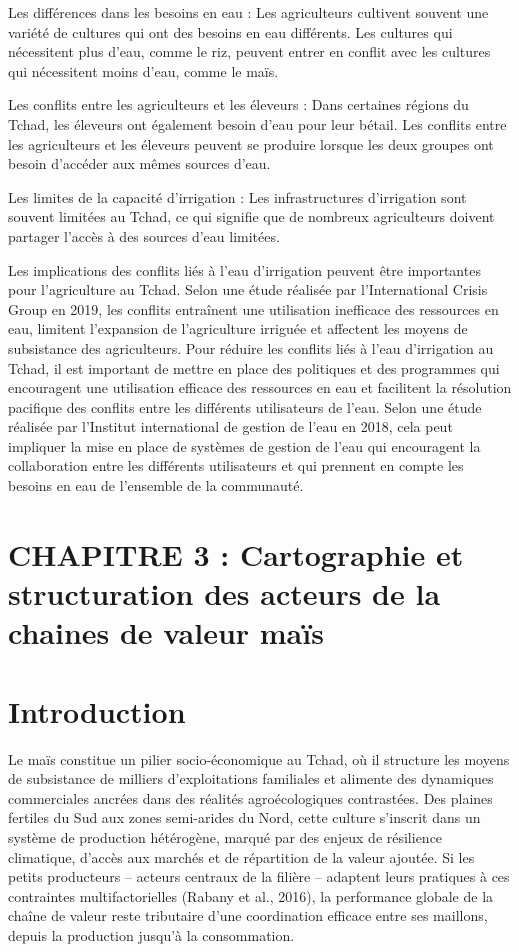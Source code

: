 \documentclass[12pt,oneside]{report}
\begin{document}
Les différences dans les besoins en eau : Les agriculteurs cultivent souvent une variété de cultures qui ont des besoins en eau différents. Les cultures qui nécessitent plus d'eau, comme le riz, peuvent entrer en conflit avec les cultures qui nécessitent moins d'eau, comme le maïs.

Les conflits entre les agriculteurs et les éleveurs : Dans certaines régions du Tchad, les éleveurs ont également besoin d'eau pour leur bétail. Les conflits entre les agriculteurs et les éleveurs peuvent se produire lorsque les deux groupes ont besoin d'accéder aux mêmes sources d'eau.

Les limites de la capacité d'irrigation : Les infrastructures d'irrigation sont souvent limitées au Tchad, ce qui signifie que de nombreux agriculteurs doivent partager l'accès à des sources d'eau limitées.

Les implications des conflits liés à l'eau d'irrigation peuvent être importantes pour l'agriculture au Tchad. Selon une étude réalisée par l'International Crisis Group en 2019, les conflits entraînent une utilisation inefficace des ressources en eau, limitent l'expansion de l'agriculture irriguée et affectent les moyens de subsistance des agriculteurs. Pour réduire les conflits liés à l'eau d'irrigation au Tchad, il est important de mettre en place des politiques et des programmes qui encouragent une utilisation efficace des ressources en eau et facilitent la résolution pacifique des conflits entre les différents utilisateurs de l'eau. Selon une étude réalisée par l'Institut international de gestion de l'eau en 2018, cela peut impliquer la mise en place de systèmes de gestion de l'eau qui encouragent la collaboration entre les différents utilisateurs et qui prennent en compte les besoins en eau de l'ensemble de la communauté.

\chapter{CHAPITRE 3 : Cartographie et structuration des acteurs de la chaines de valeur maïs}
\chapter{Introduction}
Le maïs constitue un pilier socio-économique au Tchad, où il structure les moyens de subsistance de milliers d’exploitations familiales et alimente des dynamiques commerciales ancrées dans des réalités agroécologiques contrastées. Des plaines fertiles du Sud aux zones semi-arides du Nord, cette culture s’inscrit dans un système de production hétérogène, marqué par des enjeux de résilience climatique, d’accès aux marchés et de répartition de la valeur ajoutée. Si les petits producteurs – acteurs centraux de la filière – adaptent leurs pratiques à ces contraintes multifactorielles (Rabany et al., 2016), la performance globale de la chaîne de valeur reste tributaire d’une coordination efficace entre ses maillons, depuis la production jusqu’à la consommation.
\end{document}
